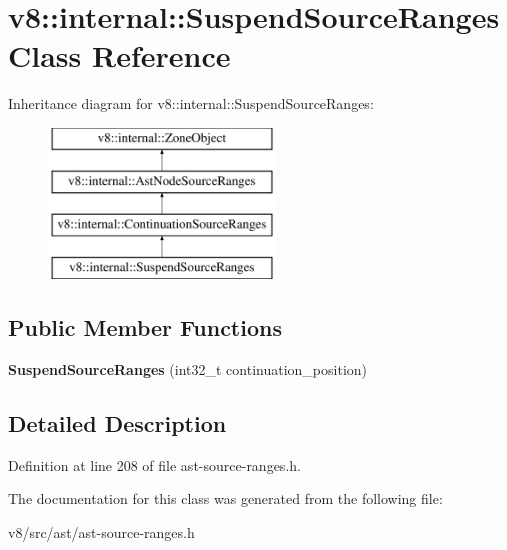 \hypertarget{classv8_1_1internal_1_1SuspendSourceRanges}{}\section{v8\+:\+:internal\+:\+:Suspend\+Source\+Ranges Class Reference}
\label{classv8_1_1internal_1_1SuspendSourceRanges}
Inheritance diagram for v8\+:\+:internal\+:\+:Suspend\+Source\+Ranges\+:\begin{figure}[H]
\begin{center}
\leavevmode
\includegraphics[height=4.000000cm]{classv8_1_1internal_1_1SuspendSourceRanges}
\end{center}
\end{figure}
\subsection*{Public Member Functions}
\begin{DoxyCompactItemize}
\item 
\mbox{\label{classv8_1_1internal_1_1SuspendSourceRanges_a5f8991697ede483152bad77bf7fe4994}} 
{\bfseries Suspend\+Source\+Ranges} (int32\+\_\+t continuation\+\_\+position)
\end{DoxyCompactItemize}


\subsection{Detailed Description}


Definition at line 208 of file ast-\/source-\/ranges.\+h.



The documentation for this class was generated from the following file\+:\begin{DoxyCompactItemize}
\item 
v8/src/ast/ast-\/source-\/ranges.\+h\end{DoxyCompactItemize}
